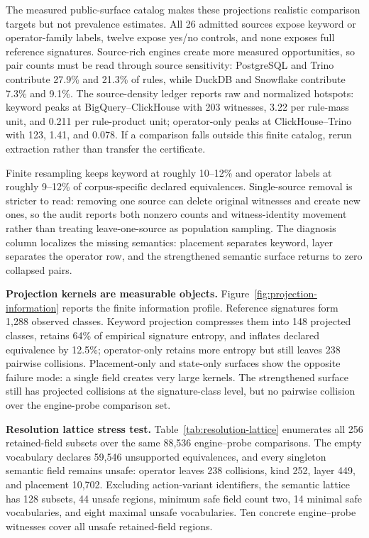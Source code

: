 

The measured public-surface catalog makes these projections realistic comparison targets but not prevalence estimates.  All 26 admitted sources expose keyword or operator-family labels, twelve expose yes/no controls, and none exposes full reference signatures.  Source-rich engines create more measured opportunities, so pair counts must be read through source sensitivity: PostgreSQL and Trino contribute 27.9\% and 21.3\% of rules, while DuckDB and Snowflake contribute 7.3\% and 9.1\%.  The source-density ledger reports raw and normalized hotspots: keyword peaks at BigQuery--ClickHouse with 203 witnesses, 3.22 per rule-mass unit, and 0.211 per rule-product unit; operator-only peaks at ClickHouse--Trino with 123, 1.41, and 0.078.  If a comparison falls outside this finite catalog, rerun extraction rather than transfer the certificate.

Finite resampling keeps keyword at roughly 10--12\% and operator labels at roughly 9--12\% of corpus-specific declared equivalences.  Single-source removal is stricter to read: removing one source can delete original witnesses and create new ones, so the audit reports both nonzero counts and witness-identity movement rather than treating leave-one-source as population sampling.  The diagnosis column localizes the missing semantics: placement separates keyword, layer separates the operator row, and the strengthened semantic surface returns to zero collapsed pairs.

\textbf{Projection kernels are measurable objects.} Figure~\ref{fig:projection-information} reports the finite information profile.  Reference signatures form 1,288 observed classes.  Keyword projection compresses them into 148 projected classes, retains 64\% of empirical signature entropy, and inflates declared equivalence by 12.5\%; operator-only retains more entropy but still leaves 238 pairwise collisions.  Placement-only and state-only surfaces show the opposite failure mode: a single field creates very large kernels.  The strengthened surface still has projected collisions at the signature-class level, but no pairwise collision over the engine-probe comparison set.



\textbf{Resolution lattice stress test.}  Table~\ref{tab:resolution-lattice} enumerates all 256 retained-field subsets over the same 88,536 engine--probe comparisons.  The empty vocabulary declares 59,546 unsupported equivalences, and every singleton semantic field remains unsafe: operator leaves 238 collisions, kind 252, layer 449, and placement 10,702.  Excluding action-variant identifiers, the semantic lattice has 128 subsets, 44 unsafe regions, minimum safe field count two, 14 minimal safe vocabularies, and eight maximal unsafe vocabularies.  Ten concrete engine--probe witnesses cover all unsafe retained-field regions.

